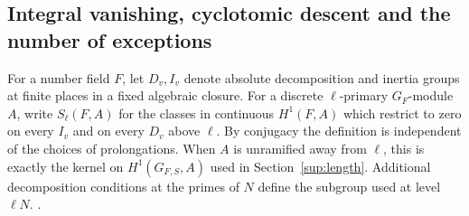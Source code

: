 \subsection{Integral vanishing, cyclotomic descent and the number of exceptions}
\label{newcoh:section}

For a number field \(F\), let \(D_v,I_v\) denote absolute decomposition
and inertia groups at finite places in a fixed algebraic closure. For a
discrete \(\ell\)-primary \(G_F\)-module \(A\), write \(S_\ell(F,A)\)
for the classes in continuous \(H^1(F,A)\) which restrict to zero on
every \(I_v\) and on every \(D_v\) above \(\ell\). By conjugacy the
definition is independent of the choices of prolongations. When \(A\)
is unramified away from \(\ell\), this is exactly the kernel on
\(H^1(G_{F,S},A)\) used in Section~\ref{sup:length}. Additional
decomposition conditions at the primes of \(N\) define the subgroup
used at level \(\ell N\).
.


